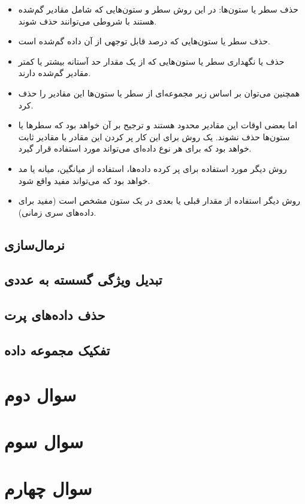 \documentclass{article}
\begin{document}
\begin{itemize}
    \item حذف سطر یا ستون‌ها: در این روش سطر و ستون‌هایی که شامل مقادیر گم‌شده هستند با شروطی می‌توانند حذف شوند.
    \item حذف سطر یا ستون‌هایی که درصد قابل توجهی از آن داده گم‌شده است.
    \item حذف یا نگهداری سطر یا ستون‌هایی که از یک مقدار حد آستانه بیشتر یا کمتر مقادیر گم‌شده دارند.
    \item همچنین می‌توان بر اساس زیر مجموعه‌ای از سطر یا ستون‌ها این مقادیر را حذف کرد.
    \item اما بعضی اوقات این مقادیر محدود هستند و ترجیح بر آن خواهد بود که سطرها یا ستون‌ها حذف نشوند. یک روش برای این کار پر کردن این مقادر با مقادیر ثابت خواهد بود که برای هر نوع داده‌ای می‌تواند مورد استفاده قرار گیرد.
    \item روش دیگر مورد استفاده برای پر کرده داده‌ها، استفاده از میانگین، میانه یا مد خواهد بود که می‌تواند مفید واقع شود.
    \item روش دیگر استفاده از مقدار قبلی یا بعدی در یک ستون مشخص است (مفید برای داده‌های سری زمانی).
\end{itemize}


\subsection{نرمال‌سازی}
\subsection{تبدیل ویژگی گسسته به عددی}
\subsection{حذف داده‌های پرت}
\subsection{تفکیک مجموعه داده}

\section{سوال دوم}


\section{سوال سوم}




\section{سوال چهارم}
\end{document}
